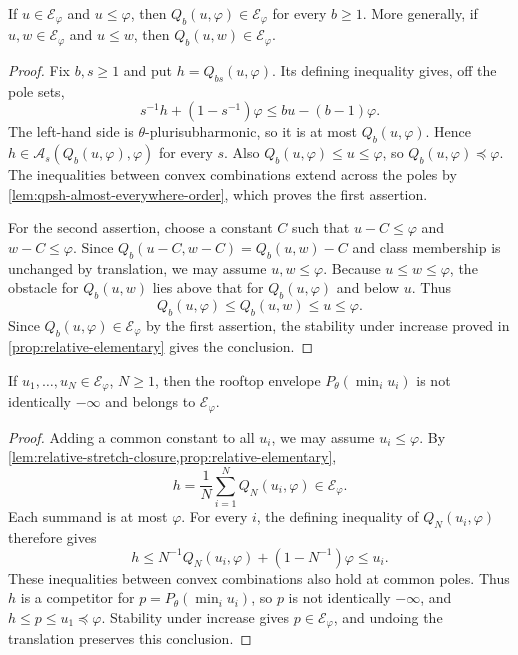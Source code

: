 \begin{lemma}\label{lem:relative-stretch-closure}
If $u\in\mathcal E_\varphi$ and $u\leq\varphi$, then $Q_b(u,\varphi)\in\mathcal E_\varphi$ for every $b\geq1$. More generally, if $u,w\in\mathcal E_\varphi$ and $u\leq w$, then $Q_b(u,w)\in\mathcal E_\varphi$.
\end{lemma}
\begin{proof}
Fix $b,s\geq1$ and put $h=Q_{bs}(u,\varphi)$. Its defining inequality gives, off the pole sets,
\[
 s^{-1}h+(1-s^{-1})\varphi\leq bu-(b-1)\varphi.
\]
The left-hand side is $\theta$-plurisubharmonic, so it is at most $Q_b(u,\varphi)$. Hence $h\in\mathcal A_s(Q_b(u,\varphi),\varphi)$ for every $s$. Also $Q_b(u,\varphi)\leq u\leq\varphi$, so $Q_b(u,\varphi)\preceq\varphi$. The inequalities between convex combinations extend across the poles by \cref{lem:qpsh-almost-everywhere-order}, which proves the first assertion.

For the second assertion, choose a constant $C$ such that $u-C\leq\varphi$ and $w-C\leq\varphi$. Since $Q_b(u-C,w-C)=Q_b(u,w)-C$ and class membership is unchanged by translation, we may assume $u,w\leq\varphi$. Because $u\leq w\leq\varphi$, the obstacle for $Q_b(u,w)$ lies above that for $Q_b(u,\varphi)$ and below $u$. Thus
\[
 Q_b(u,\varphi)\leq Q_b(u,w)\leq u\leq\varphi.
\]
Since $Q_b(u,\varphi)\in\mathcal E_\varphi$ by the first assertion, the stability under increase proved in \cref{prop:relative-elementary} gives the conclusion.
\end{proof}

\begin{proposition}\label{prop:relative-finite-rooftops}
If $u_1,\ldots,u_N\in\mathcal E_\varphi$, $N\geq1$, then the rooftop envelope $P_\theta(\min_iu_i)$ is not identically $-\infty$ and belongs to $\mathcal E_\varphi$.
\end{proposition}
\begin{proof}
Adding a common constant to all $u_i$, we may assume $u_i\leq\varphi$. By \cref{lem:relative-stretch-closure,prop:relative-elementary},
\[
 h=\frac1N\sum_{i=1}^N Q_N(u_i,\varphi)\in\mathcal E_\varphi.
\]
Each summand is at most $\varphi$. For every $i$, the defining inequality of $Q_N(u_i,\varphi)$ therefore gives
\[
 h\leq N^{-1}Q_N(u_i,\varphi)+(1-N^{-1})\varphi\leq u_i.
\]
These inequalities between convex combinations also hold at common poles. Thus $h$ is a competitor for $p=P_\theta(\min_i u_i)$, so $p$ is not identically $-\infty$, and $h\leq p\leq u_1\preceq\varphi$. Stability under increase gives $p\in\mathcal E_\varphi$, and undoing the translation preserves this conclusion.
\end{proof}

